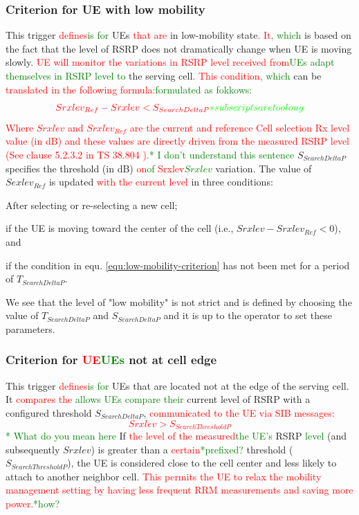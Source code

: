 \documentclass[]{IEEEtran}
\newcommand{\CAREPL}[2]{\textcolor{red}{#1}\textcolor{green}{#2}}
\begin{document}
\subsubsection{\textbf{Criterion for UE with low mobility}} This trigger \CAREPL{defines}{is for} UEs \CAREPL{that are}{} in low-mobility state\CAREPL{. It}{, which} is based on the fact that the level of RSRP does not dramatically change when UE is moving slowly. 
\CAREPL{UE will monitor the variations in RSRP level received from}{UEs adapt themselves in RSRP level to} the serving cell\CAREPL{. This condition}{, which} can be \CAREPL{translated in the following formula:}{formulated as fokkows:}
\begin{equation}
\CAREPL{Srxlev_{Ref}-Srxlev<S_{SearchDeltaP}}{*subscripts are too long}
\label{equ:low-mobility-criterion}
\end{equation}
\CAREPL{Where $Srxlev$ and $Srxlev_{Ref}$ are the current and reference Cell selection Rx level value (in dB) and these values are directly driven from the measured RSRP level (See clause 5.2.3.2 in TS 38.804 \cite{3gpp_study_nodate-4_38.804}).}{* I don't understand this sentence} 
$S_{SearchDeltaP}$ specifies the threshold (in dB) \CAREPL{on}{of} \CAREPL{Srxlev}{$Srxlev$} variation. 
The value of $Sexlev_{Ref}$ is updated \CAREPL{with the current level}{} in three conditions:
\begin{enumerate*}
    \item After selecting or re-selecting a new cell;
    \item if the UE is moving toward the center of the cell (i.e., $Srxlev-Srxlev_{Ref}<0$), and
    \item if the condition in equ. \ref{equ:low-mobility-criterion} has not been met for a period of $T_{SearchDeltaP}$.
\end{enumerate*}

We see that the level of "low mobility" is not strict and is defined by choosing the value of $T_{SearchDeltaP}$ and  $S_{SearchDeltaP}$ and it is up to the operator to set these parameters.\\

\subsubsection{\textbf{Criterion for \CAREPL{UE}{UEs} not at cell edge}} This trigger \CAREPL{defines}{is for} UEs that are located not at the edge of the serving cell. 
It \CAREPL{compares the }{allows UEs compare their} current level of RSRP with a configured threshold $S_{SearchDeltaP}$, \CAREPL{communicated to the UE via SIB messages:
\begin{equation}
Srxlev>S_{SearchThresholdP}
\label{equ:not-at-the-edge-criterion}
\end{equation}
}{* What do you mean here}
If \CAREPL{the level of the measured}{the UE's} RSRP \CAREPL{}{level} (and subsequently $Srxlev$) is greater than a \CAREPL{certain}{*prefixed?} threshold ($S_{SearchThresholdP}$), the UE is considered close to the cell center and less likely to attach to another neighbor cell. 
\CAREPL{This permits the UE to relax the mobility management setting by having less frequent RRM measurements and saving more power.}{*how?}
\end{document}
